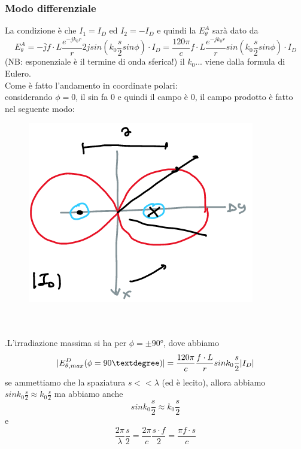 \documentclass[oneside, 12pt]{extbook}
\DeclarePairedDelimiter{\abs}{\lvert}{\rvert}
\begin{document}
\subsubsection{Modo differenziale}
La condizione è che $I_1 = I_D$ ed $I_2 = -I_D$ e quindi la $E_{\theta}^A$ sarà dato da
\begin{equation}
	E_{\theta}^A = -\bar{j}f \cdot L \dfrac{e^{-jk_0r}}{r}2jsin(k_0\frac{s}{2}sin\phi)\cdot I_D = \frac{120\pi}{c}f\cdot L \dfrac{e^{-jk_0r}}{r}sin(k_0\frac{s}{2}sin\phi)\cdot I_D
\end{equation}
(NB: esponenziale è il termine di onda sferica!) il $k_0$... viene dalla formula di Eulero.\\Come è fatto l'andamento in coordinate polari:\\considerando $\phi = 0$, il sin fa 0 e quindi il campo è 0, il campo prodotto è fatto nel seguente modo:\\
\begin{figure}[!h]
	\includegraphics[scale=0.4]{immagini/campo_modo_diff.png}
\end{figure}
\\\\.L'irradiazione massima si ha per $\phi = \pm 90°$, dove abbiamo
\begin{equation}
	\abs{E_{\theta, max}^D (\phi = 90°)} = \frac{120 \pi}{c} \frac{f \cdot L}{r} sin k_0 \frac{s}{2} \abs{I_D} 
\end{equation}
se ammettiamo che la spaziatura $s << \lambda$ (ed è lecito), allora abbiamo $sin k_0 \frac{s}{2} \approx k_0 \frac{s}{2}$ ma abbiamo anche
\begin{equation}
	sink_0\frac{s}{2} \approx k_0 \frac{s}{2}
\end{equation}
e
\begin{equation}
	\frac{2\pi}{\lambda} \frac{s}{2} = \frac{2\pi}{c}\frac{s\cdot f}{2} = \frac{\pi f \cdot s}{c}
\end{equation}
\end{document}
